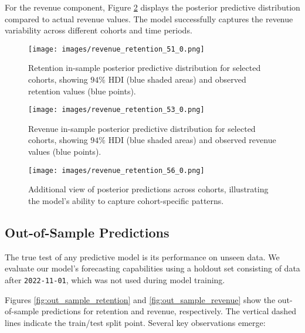 \documentclass[11pt]{amsart}
\theoremstyle{definition}
\begin{document}
For the revenue component, Figure \ref{fig:in_sample_revenue} displays the posterior predictive distribution compared to
actual revenue values. The model successfully captures the revenue variability across different cohorts and time periods.

\begin{figure}
    \centering
    \texttt{[image: images/revenue\_retention\_51\_0.png]}
    \caption{Retention in-sample posterior predictive distribution for selected cohorts, showing $94\%$ HDI (blue shaded areas)
        and observed retention values (blue points).}
    \label{fig:in_sample_retention}
\end{figure}

\begin{figure}
    \centering
    \texttt{[image: images/revenue\_retention\_53\_0.png]}
    \caption{Revenue in-sample posterior predictive distribution for selected cohorts, showing $94\%$ HDI (blue shaded areas)
        and observed revenue values (blue points).}
    \label{fig:in_sample_revenue}
\end{figure}

\begin{figure}
    \texttt{[image: images/revenue\_retention\_56\_0.png]}
    \caption{Additional view of posterior predictions across cohorts, illustrating the model's ability to capture
        cohort-specific patterns.}
    \label{fig:additional_predictions}
\end{figure}

\subsection{Out-of-Sample Predictions}

The true test of any predictive model is its performance on unseen data. We evaluate our model's forecasting capabilities
using a holdout set consisting of data after \texttt{2022-11-01}, which was not used during model training.

Figures \ref{fig:out_sample_retention} and \ref{fig:out_sample_revenue} show the out-of-sample predictions for retention and
revenue, respectively. The vertical dashed lines indicate the train/test split point. Several key observations emerge:
\end{document}
